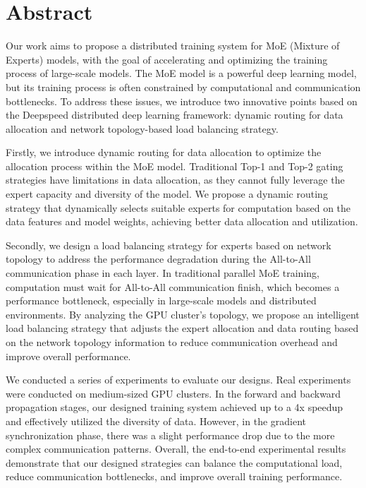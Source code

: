 ﻿\renewcommand{\baselinestretch}{1.5}
\fontsize{12pt}{13pt}\selectfont

\chapter[Abstract]{Abstract}



Our work aims to propose a distributed training system for MoE (Mixture of Experts) models, with the goal of accelerating and optimizing the training process of large-scale models. The MoE model is a powerful deep learning model, but its training process is often constrained by computational and communication bottlenecks. To address these issues, we introduce two innovative points based on the Deepspeed distributed deep learning framework: dynamic routing for data allocation and network topology-based load balancing strategy.

Firstly, we introduce dynamic routing for data allocation to optimize the allocation process within the MoE model. Traditional Top-1 and Top-2 gating strategies have limitations in data allocation, as they cannot fully leverage the expert capacity and diversity of the model. We propose a dynamic routing strategy that dynamically selects suitable experts for computation based on the data features and model weights, achieving better data allocation and utilization.

Secondly, we design a load balancing strategy for experts based on network topology to address the performance degradation during the All-to-All communication phase in each layer. In traditional parallel MoE training, computation must wait for All-to-All communication finish, which becomes a performance bottleneck, especially in large-scale models and distributed environments. By analyzing the GPU cluster's topology, we propose an intelligent load balancing strategy that adjusts the expert allocation and data routing based on the network topology information to reduce communication overhead and improve overall performance.

We conducted a series of experiments to evaluate our designs. Real experiments were conducted on medium-sized GPU clusters. In the forward and backward propagation stages, our designed training system achieved up to a 4x speedup and effectively utilized the diversity of data. However, in the gradient synchronization phase, there was a slight performance drop due to the more complex communication patterns. Overall, the end-to-end experimental results demonstrate that our designed strategies can balance the computational load, reduce communication bottlenecks, and improve overall training performance.

